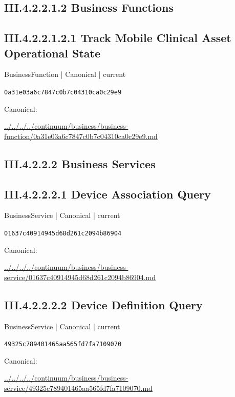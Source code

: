 \documentclass[10pt,a4paper]{article}
\begin{document}
\subsection*{III.4.2.2.1.2 Business Functions}
\subsection*{III.4.2.2.1.2.1 Track Mobile Clinical Asset Operational State}
\label{element-0a31e03a6c7847c0b7c04310ca0c29e9}
{\small BusinessFunction | Canonical | current}\par
\texttt{0a31e03a6c7847c0b7c04310ca0c29e9}\par
Canonical: \par
{\footnotesize\url{../../../../continuum/business/business-function/0a31e03a6c7847c0b7c04310ca0c29e9.md}}\par
\subsection*{III.4.2.2.2 Business Services}
\subsection*{III.4.2.2.2.1 Device Association Query}
\label{element-01637c40914945d68d261c2094b86904}
{\small BusinessService | Canonical | current}\par
\texttt{01637c40914945d68d261c2094b86904}\par
Canonical: \par
{\footnotesize\url{../../../../continuum/business/business-service/01637c40914945d68d261c2094b86904.md}}\par
\subsection*{III.4.2.2.2.2 Device Definition Query}
\label{element-49325c789401465aa565fd7fa7109070}
{\small BusinessService | Canonical | current}\par
\texttt{49325c789401465aa565fd7fa7109070}\par
Canonical: \par
{\footnotesize\url{../../../../continuum/business/business-service/49325c789401465aa565fd7fa7109070.md}}\par
\end{document}
